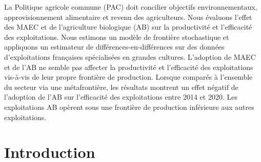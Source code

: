 \begin{Article}
\begin{refsection}[Lassalas]
  
\begin{resume}
La Politique agricole commune (PAC) doit concilier objectifs
environnementaux, approvisionnement alimentaire et revenu des
agriculteurs. Nous évaluons l'effet des MAEC et de l'agriculture biologique (AB) sur la productivité et l'efficacité des exploitations. Nous estimons un modèle
de frontière stochastique et appliquons un estimateur de différences-en-différences sur des données d'exploitations françaises spécialisées en grandes cultures. L'adoption de MAEC et de l'AB ne semble pas affecter la productivité et l'efficacité des exploitations vis-à-vis de leur propre frontière de production. Lorsque comparés à l'ensemble du secteur via une métafrontière,
les résultats montrent un effet négatif de l'adoption de l'AB sur l'efficacité des exploitations entre 2014 et 2020. Les exploitations AB opèrent sous une frontière de production inférieure aux autres exploitations.
\end{resume}





\section{Introduction}


\end{refsection}
\end{Article}
